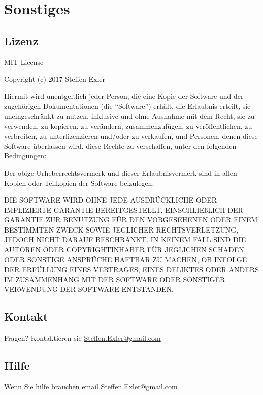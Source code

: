 \documentclass[letterpaper,10pt,ngerman]{sphinxmanual}
\begin{document}
\chapter{Sonstiges}
\label{\detokenize{index:sonstiges}}

\section{Lizenz}
\label{\detokenize{license::doc}}\label{\detokenize{license:lizenz}}
MIT License

Copyright (c) 2017 Steffen Exler

Hiermit wird unentgeltlich jeder Person, die eine Kopie der Software und der zugehörigen Dokumentationen (die ``Software'') erhält, die Erlaubnis erteilt, sie uneingeschränkt zu nutzen, inklusive und ohne Ausnahme mit dem Recht, sie zu verwenden, zu kopieren, zu verändern, zusammenzufügen, zu veröffentlichen, zu verbreiten, zu unterlizenzieren und/oder zu verkaufen, und Personen, denen diese Software überlassen wird, diese Rechte zu verschaffen, unter den folgenden Bedingungen:

Der obige Urheberrechtsvermerk und dieser Erlaubnisvermerk sind in allen Kopien oder Teilkopien der Software beizulegen.

DIE SOFTWARE WIRD OHNE JEDE AUSDRÜCKLICHE ODER IMPLIZIERTE GARANTIE BEREITGESTELLT, EINSCHLIEßLICH DER GARANTIE ZUR BENUTZUNG FÜR DEN VORGESEHENEN ODER EINEM BESTIMMTEN ZWECK SOWIE JEGLICHER RECHTSVERLETZUNG, JEDOCH NICHT DARAUF BESCHRÄNKT. IN KEINEM FALL SIND DIE AUTOREN ODER COPYRIGHTINHABER FÜR JEGLICHEN SCHADEN ODER SONSTIGE ANSPRÜCHE HAFTBAR ZU MACHEN, OB INFOLGE DER ERFÜLLUNG EINES VERTRAGES, EINES DELIKTES ODER ANDERS IM ZUSAMMENHANG MIT DER SOFTWARE ODER SONSTIGER VERWENDUNG DER SOFTWARE ENTSTANDEN.


\section{Kontakt}
\label{\detokenize{license:kontakt}}
Fragen? Kontaktieren sie \href{mailto:Steffen.Exler@gmail.com}{Steffen.Exler@gmail.com}


\section{Hilfe}
\label{\detokenize{help:hilfe}}\label{\detokenize{help::doc}}
Wenn Sie hilfe brauchen email \href{mailto:Steffen.Exler@gmail.com}{Steffen.Exler@gmail.com}
\end{document}
